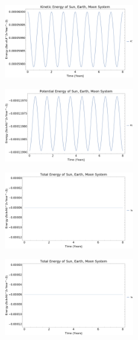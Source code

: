 \documentclass{article}
\begin{document}
\begin{figure}[!htb]
	\begin{center}
		\includegraphics[width=0.5\textwidth]{p1-1d.pdf}
	\end{center}
	\caption{}
\label{fig:qual}
\end{figure}
\FloatBarrier


\begin{figure}[!htb]
	\begin{center}
		\includegraphics[width=0.5\textwidth]{p1-1e.pdf}
	\end{center}
	\caption{}
\label{fig:qual}
\end{figure}
\FloatBarrier


\begin{figure}[!htb]
	\begin{center}
		\includegraphics[width=0.5\textwidth]{p1-1f.pdf}
	\end{center}
	\caption{}
\label{fig:qual}
\end{figure}
\FloatBarrier

\begin{figure}[!htb]
	\begin{center}
		\includegraphics[width=0.5\textwidth]{p1-1f.pdf}
	\end{center}
	\caption{}
\label{fig:qual}
\end{figure}
\FloatBarrier
\end{document}
